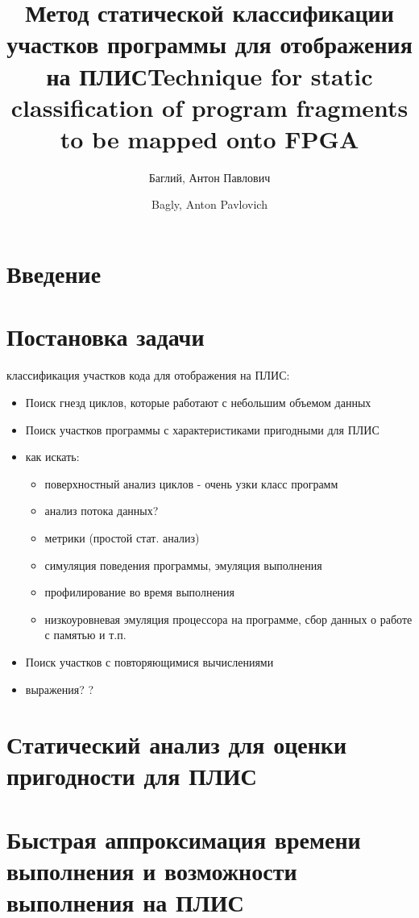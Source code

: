 \documentclass[utf8]{psta}%
\title[Статическая классификация программ для ПЛИС]{Метод статической классификации участков программы для отображения на ПЛИС}
\author{Баглий, Антон Павлович}
\title[Static program classification for FPGA]{Technique for static classification of program fragments to be mapped onto FPGA}
\author{Bagly, Anton Pavlovich}
\begin{document}
           
\maketitle   
\section*{Введение}

\section{Постановка задачи} 

классификация участков кода для отображения на ПЛИС:

\begin{itemize}
    \item Поиск гнезд циклов, которые работают с небольшим объемом данных
    \item Поиск участков программы с характеристиками пригодными для ПЛИС
    \item как искать:
    \begin{itemize}
        \item поверхностный анализ циклов - очень узки класс программ
        \item анализ потока данных?
        \item метрики (простой стат. анализ)
        \item симуляция поведения программы, эмуляция выполнения
        \item профилирование во время выполнения
        \item низкоуровневая эмуляция процессора на программе, сбор данных о работе с памятью и т.п.
    \end{itemize}
   \item Поиск участков с повторяющимися вычислениями
   \item выражения?
   ?
\end{itemize}

\section{Статический анализ для оценки пригодности для ПЛИС}

\section{Быстрая аппроксимация времени выполнения и возможности выполнения на ПЛИС} 
\end{document}

